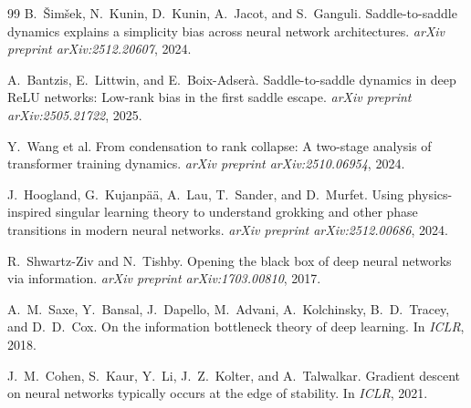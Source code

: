 \documentclass{article}
\theoremstyle{definition}
\begin{document}
\begin{thebibliography}{99}
B.~\v{S}im\v{s}ek, N.~Kunin, D.~Kunin, A.~Jacot, and S.~Ganguli.
\newblock Saddle-to-saddle dynamics explains a simplicity bias across neural network architectures.
\newblock \emph{arXiv preprint arXiv:2512.20607}, 2024.

A.~Bantzis, E.~Littwin, and E.~Boix-Adser\`a.
\newblock Saddle-to-saddle dynamics in deep {ReLU} networks: Low-rank bias in the first saddle escape.
\newblock \emph{arXiv preprint arXiv:2505.21722}, 2025.

Y.~Wang et al.
\newblock From condensation to rank collapse: A two-stage analysis of transformer training dynamics.
\newblock \emph{arXiv preprint arXiv:2510.06954}, 2024.

J.~Hoogland, G.~Kujanp\"a\"a, A.~Lau, T.~Sander, and D.~Murfet.
\newblock Using physics-inspired singular learning theory to understand grokking and other phase transitions in modern neural networks.
\newblock \emph{arXiv preprint arXiv:2512.00686}, 2024.

R.~Shwartz-Ziv and N.~Tishby.
\newblock Opening the black box of deep neural networks via information.
\newblock \emph{arXiv preprint arXiv:1703.00810}, 2017.

A.~M.~Saxe, Y.~Bansal, J.~Dapello, M.~Advani, A.~Kolchinsky, B.~D.~Tracey, and D.~D.~Cox.
\newblock On the information bottleneck theory of deep learning.
\newblock In \emph{ICLR}, 2018.

J.~M.~Cohen, S.~Kaur, Y.~Li, J.~Z.~Kolter, and A.~Talwalkar.
\newblock Gradient descent on neural networks typically occurs at the edge of stability.
\newblock In \emph{ICLR}, 2021.

\end{thebibliography}
\end{document}
